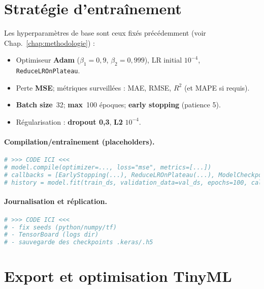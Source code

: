 \section{Stratégie d’entraînement}
\label{sec:entrainement}

Les hyperparamètres de base sont ceux fixés précédemment (voir Chap.~\ref{chap:methodologie}) :
\begin{itemize}
    \item Optimiseur \textbf{Adam} (\(\beta_1=0{,}9\), \(\beta_2=0{,}999\)), LR initial \(10^{-4}\), \texttt{ReduceLROnPlateau}.
    \item Perte \textbf{MSE}; métriques surveillées : MAE, RMSE, \(R^2\) (et MAPE si requis).
    \item \textbf{Batch size}~32; \textbf{max}~100 époques; \textbf{early stopping} (patience 5).
    \item Régularisation : \textbf{dropout 0{,}3}, \textbf{L2} \(10^{-4}\).
\end{itemize}

\paragraph{Compilation/entraînement (placeholders).}
\begin{lstlisting}[language=Python,caption={(Placeholder) Compilation et fit Keras},label={lst:fit}]
# >>> CODE ICI <<<
# model.compile(optimizer=..., loss="mse", metrics=[...])
# callbacks = [EarlyStopping(...), ReduceLROnPlateau(...), ModelCheckpoint(...)]
# history = model.fit(train_ds, validation_data=val_ds, epochs=100, callbacks=callbacks)
\end{lstlisting}

\paragraph{Journalisation et réplication.}
\begin{lstlisting}[language=Python,caption={(Placeholder) Seeds, TensorBoard, sauvegarde checkpoints},label={lst:tb}]
# >>> CODE ICI <<<
# - fix seeds (python/numpy/tf)
# - TensorBoard (logs dir)
# - sauvegarde des checkpoints .keras/.h5
\end{lstlisting}

\section{Export et optimisation TinyML}
\label{sec:optim_tinyml}

